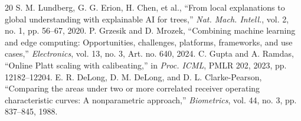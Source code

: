 \documentclass[journal]{IEEEtran}
\begin{document}
\begin{thebibliography}{20}
 S. M. Lundberg, G. G. Erion, H. Chen, et al., ``From local explanations to global understanding with explainable AI for trees,'' \emph{Nat. Mach. Intell.}, vol. 2, no. 1, pp. 56--67, 2020.
 P. Grzesik and D. Mrozek, ``Combining machine learning and edge computing: Opportunities, challenges, platforms, frameworks, and use cases,'' \emph{Electronics}, vol. 13, no. 3, Art. no. 640, 2024.
 C. Gupta and A. Ramdas, ``Online Platt scaling with calibeating,'' in \emph{Proc. ICML}, PMLR 202, 2023, pp. 12182--12204.
 E. R. DeLong, D. M. DeLong, and D. L. Clarke-Pearson, ``Comparing the areas under two or more correlated receiver operating characteristic curves: A nonparametric approach,'' \emph{Biometrics}, vol. 44, no. 3, pp. 837--845, 1988.
\end{thebibliography}
\end{document}

